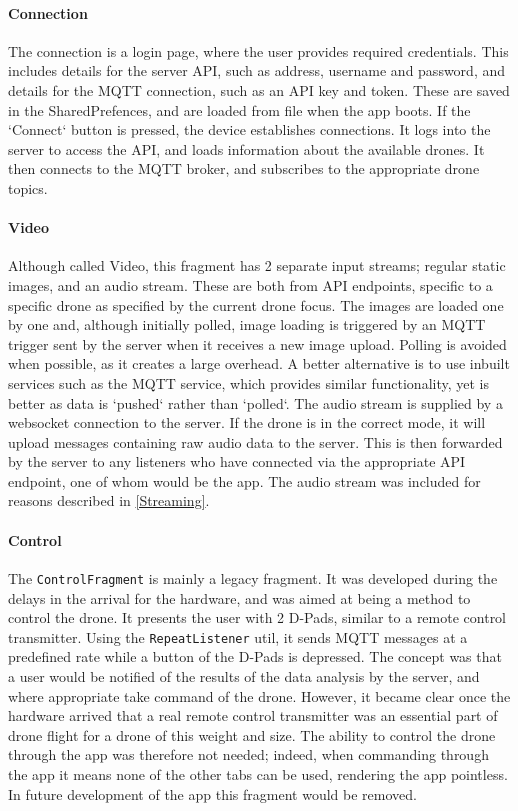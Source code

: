 \documentclass{article}
\begin{document}
\paragraph{Connection}
The connection is a login page, where the user provides required credentials. This includes details for the server API, such as address, username and password, and details for the MQTT connection, such as an API key and token. These are saved in the SharedPrefences, and are loaded from file when the app boots. If the `Connect` button is pressed, the device establishes connections. It logs into the server to access the API, and loads information about the available drones. It then connects to the MQTT broker, and subscribes to the appropriate drone topics.

\paragraph{Video}
Although called Video, this fragment has 2 separate input streams; regular static images, and an audio stream. These are both from API endpoints, specific to a specific drone as specified by the current drone focus. The images are loaded one by one and, although initially polled, image loading is triggered by an MQTT trigger sent by the server when it receives a new image upload. Polling is avoided when possible, as it creates a large overhead. A better alternative is to use inbuilt services such as the MQTT service, which provides similar functionality, yet is better as data is `pushed` rather than `polled`. The audio stream is supplied by a websocket connection to the server. If the drone is in the correct mode, it will upload messages containing raw audio data to the server. This is then forwarded by the server to any listeners who have connected via the appropriate API endpoint, one of whom would be the app. The audio stream was included for reasons described in \ref{Streaming}.

\paragraph{Control}
The \texttt{ControlFragment} is mainly a legacy fragment. It was developed during the delays in the arrival for the hardware, and was aimed at being a method to control the drone. It presents the user with 2 D-Pads, similar to a remote control transmitter. Using the \texttt{RepeatListener} util, it sends MQTT messages at a predefined rate while a button of the D-Pads is depressed. The concept was that a user would be notified of the results of the data analysis by the server, and where appropriate take command of the drone. However, it became clear once the hardware arrived that a real remote control transmitter was an essential part of drone flight for a drone of this weight and size. The ability to control the drone through the app was therefore not needed; indeed, when commanding through the app it means none of the other tabs can be used, rendering the app pointless. In future development of the app this fragment would be removed.
\end{document}
